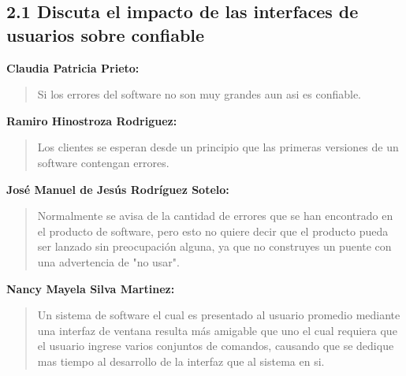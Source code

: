 \subsection*{2.1 Discuta el impacto de las interfaces de usuarios sobre confiable}

\textbf{Claudia Patricia Prieto:}
\begin{quote}
Si los errores del software no son muy grandes aun asi es confiable.
\end{quote}

\textbf{Ramiro Hinostroza Rodriguez:}
\begin{quote}
Los clientes se esperan desde un principio que las primeras versiones de un software contengan errores.
\end{quote}

\textbf{José Manuel de Jesús Rodríguez Sotelo:}
\begin{quote}
Normalmente se avisa de la cantidad de errores que se han encontrado en el producto de software, pero esto no quiere decir que el producto pueda ser lanzado sin preocupación alguna, ya que no construyes un puente con una advertencia de "no usar".
\end{quote}

\textbf{Nancy Mayela Silva Martinez:}
\begin{quote}
Un sistema de software el cual es presentado al usuario promedio mediante una interfaz de ventana resulta más amigable que uno el cual requiera que el usuario ingrese varios conjuntos de comandos, causando que se dedique mas tiempo al desarrollo de la interfaz que al sistema en si.
\end{quote}